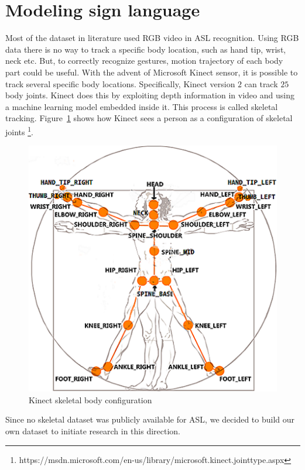 \documentclass[10pt,twocolumn,letterpaper]{article}
\begin{document}
\section{Modeling sign language}

Most of the dataset in literature used RGB video in ASL recognition. Using RGB data there is no way to track a specific body location, such as hand tip, wrist, neck etc. But, to correctly recognize gestures, motion trajectory of each body part could be useful. With the advent of Microsoft Kinect sensor, it is possible to track several specific body locations. Specifically, Kinect version $2$ can track $25$ body joints. Kinect does this by exploiting depth information in video and using a machine learning model embedded inside it. This process is called skeletal tracking. Figure~\ref{fig:kinect_sk} shows how Kinect sees a person as a configuration of skeletal joints \footnote{https://msdn.microsoft.com/en-us/library/microsoft.kinect.jointtype.aspx}. 
\begin{figure}[h]
	\begin{center}
		\includegraphics[width=.8\linewidth]{kinect_sk}
	\end{center}
	\caption{Kinect skeletal body configuration}
	\label{fig:kinect_sk}
\end{figure}
Since no skeletal dataset was publicly available for ASL, we decided to build our own dataset to initiate research in this direction.  
\end{document}
